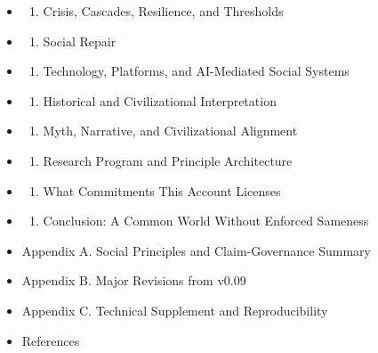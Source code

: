 \documentclass[
  11pt,
]{article}
\providecommand{\tightlist}{%
  \setlength{\itemsep}{0pt}\setlength{\parskip}{0pt}}
\begin{document}
\begin{itemize}
\begin{enumerate}
  \end{enumerate}
\item
  \begin{enumerate}
  \def\labelenumi{\arabic{enumi}.}
  \setcounter{enumi}{8}
  \tightlist
  \item
    Crisis, Cascades, Resilience, and Thresholds
  \end{enumerate}
\item
  \begin{enumerate}
  \def\labelenumi{\arabic{enumi}.}
  \setcounter{enumi}{9}
  \tightlist
  \item
    Social Repair
  \end{enumerate}
\item
  \begin{enumerate}
  \def\labelenumi{\arabic{enumi}.}
  \setcounter{enumi}{10}
  \tightlist
  \item
    Technology, Platforms, and AI-Mediated Social Systems
  \end{enumerate}
\item
  \begin{enumerate}
  \def\labelenumi{\arabic{enumi}.}
  \setcounter{enumi}{11}
  \tightlist
  \item
    Historical and Civilizational Interpretation
  \end{enumerate}
\item
  \begin{enumerate}
  \def\labelenumi{\arabic{enumi}.}
  \setcounter{enumi}{12}
  \tightlist
  \item
    Myth, Narrative, and Civilizational Alignment
  \end{enumerate}
\item
  \begin{enumerate}
  \def\labelenumi{\arabic{enumi}.}
  \setcounter{enumi}{13}
  \tightlist
  \item
    Research Program and Principle Architecture
  \end{enumerate}
\item
  \begin{enumerate}
  \def\labelenumi{\arabic{enumi}.}
  \setcounter{enumi}{14}
  \tightlist
  \item
    What Commitments This Account Licenses
  \end{enumerate}
\item
  \begin{enumerate}
  \def\labelenumi{\arabic{enumi}.}
  \setcounter{enumi}{15}
  \tightlist
  \item
    Conclusion: A Common World Without Enforced Sameness
  \end{enumerate}
\item
  Appendix A. Social Principles and Claim-Governance Summary
\item
  Appendix B. Major Revisions from v0.09
\item
  Appendix C. Technical Supplement and Reproducibility
\item
  References
\end{itemize}
\end{document}
